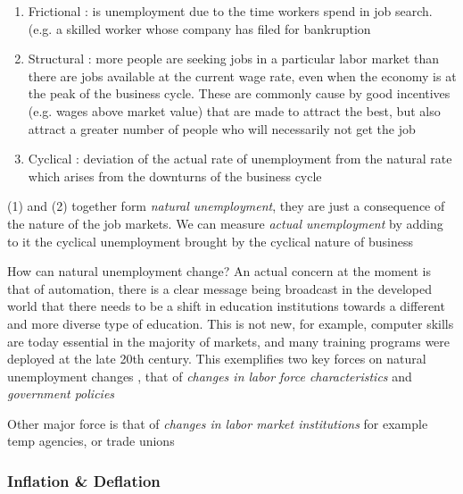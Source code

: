 \documentclass[english,course]{Notes}
\newcommand{\ita}[1]{\textit{#1}}
\begin{document}
{\begin{enumerate}
	\item Frictional : is
unemployment due to the time
workers spend in job search. (e.g. a skilled worker whose company has filed for bankruption
	\item Structural : more people are seeking jobs in a
particular labor market than there are
jobs available at the current wage
rate, even when the economy is at
the peak of the business cycle. These are commonly cause by good incentives (e.g. wages above market value) that are made to attract the best, but also attract a greater number of people who will necessarily not get the job 
	\item Cyclical : deviation of the actual rate of unemployment from the
natural rate which arises from the downturns of the business cycle
\end{enumerate}

\par{(1) and (2) together form \ita{natural unemployment}, they are just a consequence of the nature of the job markets. We can measure \ita{actual unemployment} by adding to it the cyclical unemployment brought by the cyclical nature of business}




\par{How can natural unemployment change? An actual concern at the moment is that of automation, there is a clear message being broadcast in the developed world that there needs to be a shift in education institutions towards a different and more diverse type of education. This is not new, for example, computer skills are today essential in the majority of markets, and many training programs were deployed at the late 20th century. This exemplifies two key forces on natural unemployment changes , that of \ita{changes in labor force characteristics} and \ita{government policies}}
\par{Other major force is that of \ita{changes in labor market institutions} for example temp agencies, or trade unions}

\subsubsection{Inflation \& Deflation}

}
\end{document}
